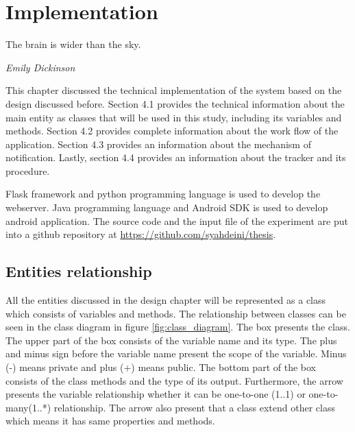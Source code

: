 


\chapter{Implementation}
\epigraph{The brain is wider than the sky.}{\textit{Emily Dickinson}}

This chapter discussed the technical implementation of the system based on the design discussed before.
Section 4.1 provides the technical information about the main entity as classes that will be used in this study, including its variables and methods.
Section 4.2  provides complete information about the work flow of the application.
Section 4.3 provides an information about the mechanism of notification. Lastly, section 4.4 provides an information about the tracker and its procedure.

Flask framework and python programming language is used to develop the webserver. Java programming language and Android SDK is used to develop android application.
The source code and the input file of the experiment are put into a github repository at \href{https://github.com/syahdeini/thesis}{https://github.com/syahdeini/thesis}.




\section{Entities relationship}
All the entities discussed in the design chapter will be represented as a class which consists of variables and methods.
The relationship between classes can be seen in the class diagram in figure \ref{fig:class_diagram}.
 The box presents the class. The upper part of the box consists of the variable name and its type.
 The plus and minus sign before the variable name present the scope of the variable.
  Minus (-) means private and plus (+) means public.
  The bottom part of the box consists of the class methods and the type of its output.
  Furthermore, the arrow presents the variable relationship whether it can be one-to-one (1..1)  or one-to-many(1..*) relationship.
  The arrow also present that a class extend other class which means it has same properties and methods.

